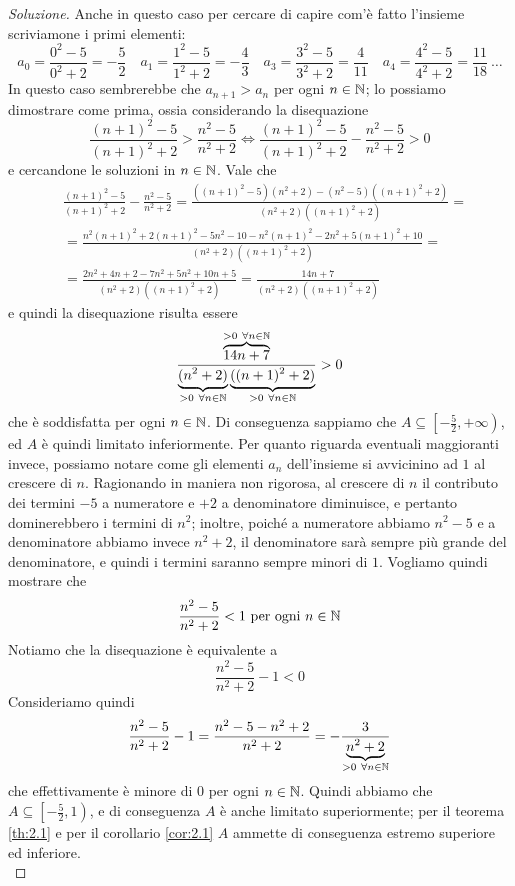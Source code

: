 \begin{proof}[Soluzione]
    Anche in questo caso per cercare di capire com'è fatto l'insieme scriviamone i primi elementi:
    \[
    a_0 = \frac{0^2-5}{0^2+2} = -\frac{5}{2} \quad a_1 = \frac{1^2-5}{1^2+2} = -\frac{4}{3} \quad a_3 = \frac{3^2-5}{3^2+2} = \frac{4}{11} \quad a_4 = \frac{4^2-5}{4^2+2} = \frac{11}{18} \ \dots
    \]
    In questo caso sembrerebbe che $a_{n+1}>a_n$ per ogni $n\in\amsbb{N}$; lo possiamo dimostrare come prima, ossia considerando la disequazione
    \[
    \frac{(n+1)^2-5}{(n+1)^2+2}>\frac{n^2-5}{n^2+2} \iff \frac{(n+1)^2-5}{(n+1)^2+2}-\frac{n^2-5}{n^2+2}>0
    \]
    e cercandone le soluzioni in $n\in\amsbb{N}$. Vale che
    \[
    \begin{split}
        &\frac{(n+1)^2-5}{(n+1)^2+2}-\frac{n^2-5}{n^2+2} = \frac{((n+1)^2-5)(n^2+2)-(n^2-5)((n+1)^2+2)}{(n^2+2)((n+1)^2+2)} = \\
        & = \frac{n^2(n+1)^2+2(n+1)^2-5n^2-10-n^2(n+1)^2-2n^2+5(n+1)^2+10}{(n^2+2)((n+1)^2+2)} = \\
        & = \frac{2n^2+4n+2-7n^2+5n^2+10n+5}{(n^2+2)((n+1)^2+2)} = \frac{14n+7}{(n^2+2)((n+1)^2+2)}
    \end{split}
    \]
    e quindi la disequazione risulta essere
    \[
    \frac{\overbrace{14n+7}^{>0 \ \forall n\in\amsbb{N}}}{\underbrace{(n^2+2)}_{>0 \ \forall n\in\amsbb{N}}\underbrace{((n+1)^2+2)}_{>0 \ \forall n\in \amsbb{N}}}>0
    \]
    che è soddisfatta per ogni $n\in\amsbb{N}$. Di conseguenza sappiamo che $A \subseteq \left[-\frac{5}{2}, +\infty\right)$, ed $A$ è quindi limitato inferiormente. Per quanto riguarda eventuali maggioranti invece, possiamo notare come gli elementi $a_n$ dell'insieme si avvicinino ad $1$ al crescere di $n$. Ragionando in maniera non rigorosa, al crescere di $n$ il contributo dei termini $-5$ a numeratore e $+2$ a denominatore diminuisce, e pertanto dominerebbero i termini di $n^2$; inoltre, poiché a numeratore abbiamo $n^2-5$ e a denominatore abbiamo invece $n^2+2$, il denominatore sarà sempre più grande del denominatore, e quindi i termini saranno sempre minori di $1$. Vogliamo quindi mostrare che
    \[
    \frac{n^2-5}{n^2+2}<1 \ \text{per ogni} \ n\in\amsbb{N}
    \]
    Notiamo che la disequazione è equivalente a
    \[
    \frac{n^2-5}{n^2+2}-1 <0 
    \]
    Consideriamo quindi
    \[
    \frac{n^2-5}{n^2+2}-1 = \frac{n^2-5-n^2+2}{n^2+2} = -\frac{3}{\underbrace{n^2+2}_{>0 \ \forall n\in\amsbb{N}}}
    \]
    che effettivamente è minore di 0 per ogni $n\in\amsbb{N}$. Quindi abbiamo che $A\subseteq\left[-\frac{5}{2}, 1\right)$, e di conseguenza $A$ è anche limitato superiormente; per il teorema \ref{th:2.1} e per il corollario \ref{cor:2.1} $A$ ammette di conseguenza estremo superiore ed inferiore.\\

\end{proof}
